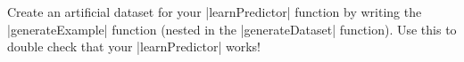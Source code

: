 \item {}

Create an artificial dataset for your |learnPredictor| function by
writing the |generateExample| function (nested in the |generateDataset|
function). Use this to double check that your |learnPredictor| works!

